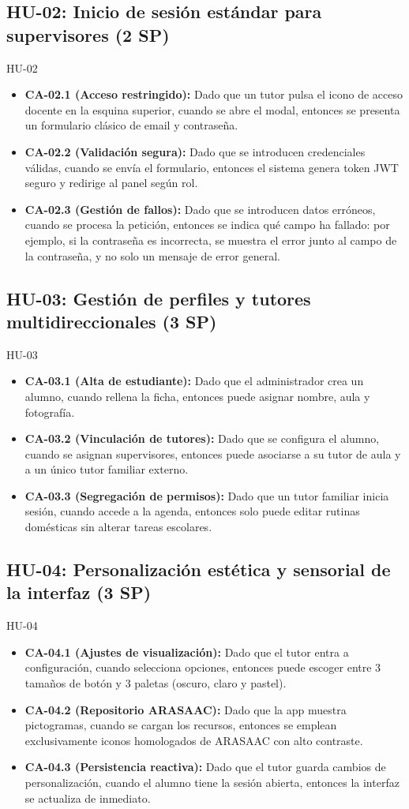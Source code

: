 \documentclass[11pt,a4paper]{article}
\newcommand{\ca}[2]{\item \textbf{#1:} #2}
\begin{document}
\subsection{HU-02: Inicio de sesión estándar para supervisores (2 SP)}
\begin{criterios}{HU-02}
\begin{itemize}
\ca{CA-02.1 (Acceso restringido)}{Dado que un tutor pulsa el icono de acceso docente en la esquina superior, cuando se abre el modal, entonces se presenta un formulario clásico de email y contraseña.}
\ca{CA-02.2 (Validación segura)}{Dado que se introducen credenciales válidas, cuando se envía el formulario, entonces el sistema genera token JWT seguro y redirige al panel según rol.}
\ca{CA-02.3 (Gestión de fallos)}{Dado que se introducen datos erróneos, cuando se procesa la petición, entonces se indica qué campo ha fallado: por ejemplo, si la contraseña es incorrecta, se muestra el error junto al campo de la contraseña, y no solo un mensaje de error general.}
\end{itemize}
\end{criterios}

\subsection{HU-03: Gestión de perfiles y tutores multidireccionales (3 SP)}
\begin{criterios}{HU-03}
\begin{itemize}
\ca{CA-03.1 (Alta de estudiante)}{Dado que el administrador crea un alumno, cuando rellena la ficha, entonces puede asignar nombre, aula y fotografía.}
\ca{CA-03.2 (Vinculación de tutores)}{Dado que se configura el alumno, cuando se asignan supervisores, entonces puede asociarse a su tutor de aula y a un único tutor familiar externo.}
\ca{CA-03.3 (Segregación de permisos)}{Dado que un tutor familiar inicia sesión, cuando accede a la agenda, entonces solo puede editar rutinas domésticas sin alterar tareas escolares.}
\end{itemize}
\end{criterios}

\subsection{HU-04: Personalización estética y sensorial de la interfaz (3 SP)}
\begin{criterios}{HU-04}
\begin{itemize}
\ca{CA-04.1 (Ajustes de visualización)}{Dado que el tutor entra a configuración, cuando selecciona opciones, entonces puede escoger entre 3 tamaños de botón y 3 paletas (oscuro, claro y pastel).}
\ca{CA-04.2 (Repositorio ARASAAC)}{Dado que la app muestra pictogramas, cuando se cargan los recursos, entonces se emplean exclusivamente iconos homologados de ARASAAC con alto contraste.}
\ca{CA-04.3 (Persistencia reactiva)}{Dado que el tutor guarda cambios de personalización, cuando el alumno tiene la sesión abierta, entonces la interfaz se actualiza de inmediato.}
\end{itemize}
\end{criterios}
\end{document}
